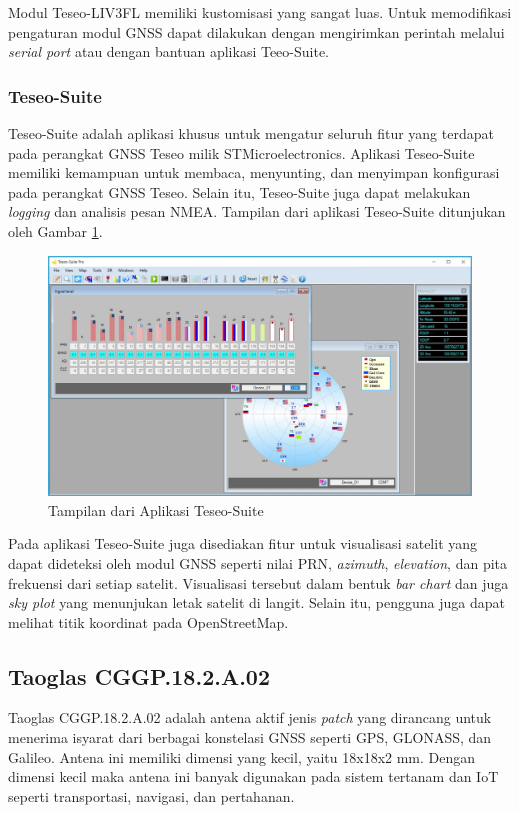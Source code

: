 Modul Teseo-LIV3FL memiliki kustomisasi yang sangat luas. Untuk memodifikasi pengaturan modul GNSS dapat dilakukan dengan mengirimkan perintah melalui \textit{serial port} atau dengan bantuan aplikasi Teeo-Suite.

\subsubsection{Teseo-Suite}
Teseo-Suite adalah aplikasi khusus untuk mengatur seluruh fitur yang terdapat pada perangkat GNSS Teseo milik STMicroelectronics. Aplikasi Teseo-Suite memiliki kemampuan untuk membaca, menyunting, dan menyimpan konfigurasi pada perangkat GNSS Teseo. Selain itu, Teseo-Suite juga dapat melakukan \textit{logging} dan analisis pesan NMEA. Tampilan dari aplikasi Teseo-Suite ditunjukan oleh Gambar \ref{Fig: teseo-suite-ss}.

\begin{figure}[ht]
	\centering
	\includegraphics[width=13cm]{contents/chapter-2/teseo-suite.jpeg}
	\caption{Tampilan dari Aplikasi Teseo-Suite}
	\label{Fig: teseo-suite-ss}
\end{figure}

Pada aplikasi Teseo-Suite juga disediakan fitur untuk visualisasi satelit yang dapat dideteksi oleh modul GNSS seperti nilai PRN, \textit{azimuth}, \textit{elevation}, dan pita frekuensi dari setiap satelit. Visualisasi tersebut dalam bentuk \textit{bar chart} dan juga \textit{sky plot} yang menunjukan letak satelit di langit. Selain itu, pengguna juga dapat melihat titik koordinat pada OpenStreetMap.

\subsection{Taoglas CGGP.18.2.A.02}
Taoglas CGGP.18.2.A.02 adalah antena aktif jenis \textit{patch} yang dirancang untuk menerima isyarat dari berbagai konstelasi GNSS seperti GPS, GLONASS, dan Galileo. Antena ini memiliki dimensi yang kecil, yaitu 18x18x2 mm. Dengan dimensi kecil maka antena ini banyak digunakan pada sistem tertanam dan IoT seperti transportasi, navigasi, dan pertahanan.

